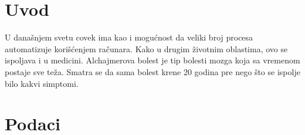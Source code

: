 \documentclass[12pt,oneside]{memoir}
\begin{document}
\frontmatter
\naslovna
\komisija
\tableofcontents*

\mainmatter


\chapter{Uvod}

U današnjem svetu covek ima kao i mogućnost da veliki broj procesa automatizuje korišćenjem računara.  Kako u drugim životnim oblastima,  ovo se ispoljava i u medicini.  Alchajmerova bolest je tip bolesti mozga koja sa vremenom postaje sve teža.  Smatra se da sama bolest krene 20 godina pre nego što se ispolje bilo kakvi simptomi. 


\chapter{Podaci}
\end{document}
